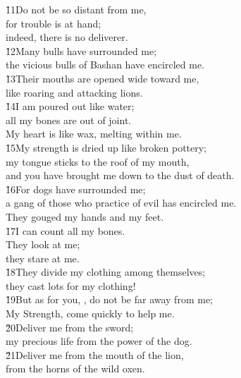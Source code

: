\begin{poetry}
\poeml \v{11}Do not be so distant from me, \\
\poemll    for trouble is at hand; \\
\poemlll       indeed, there is no deliverer. \\
\poeml \v{12}Many bulls have surrounded me; \\
\poemll    the vicious bulls of Bashan have encircled me. \\
\poeml \v{13}Their mouths are opened wide toward me, \\
\poemll    like roaring and attacking lions. \\
\poeml \v{14}I am poured out like water; \\
\poemll    all my bones are out of joint. \\
\poemlll       My heart is like wax, melting within me. \\
\poeml \v{15}My strength is dried up like broken pottery; \\
\poemll    my tongue sticks to the roof of my mouth, \\
\poemlll       and you have brought me down to the dust of death. \\
\poeml \v{16}For dogs have surrounded me; \\
\poemll    a gang of those who practice of evil has encircled me. \\
\poemlll       They gouged my hands and my feet. \\
\poeml \v{17}I can count all my bones. \\
\poemll    They look at me; \\
\poemlll       they stare at me. \\
\poeml \v{18}They divide my clothing among themselves; \\
\poemll    they cast lots for my clothing! \\
\poeml \v{19}But as for you, , do not be far away from me; \\
\poemll    My Strength, come quickly to help me. \\
\poeml \v{20}Deliver me from the sword; \\
\poemll    my precious life from the power of the dog. \\
\poeml \v{21}Deliver me from the mouth of the lion, \\
\poemll    from the horns of the wild oxen. \\

\end{poetry}
